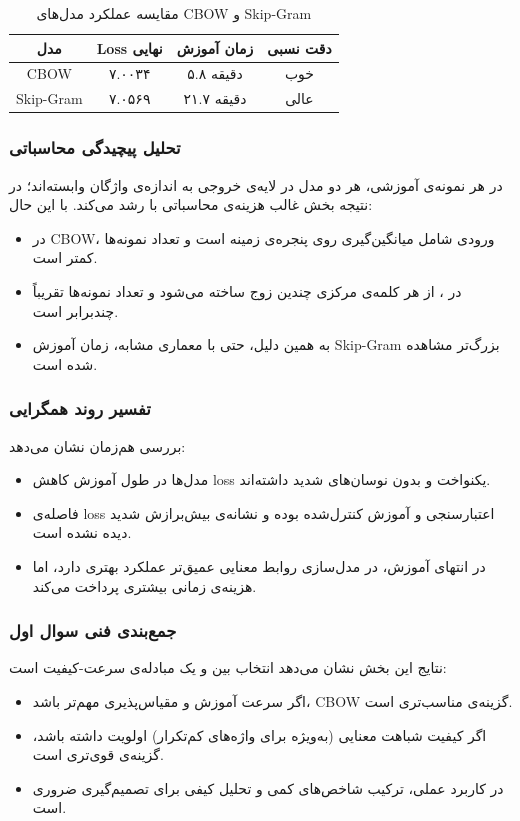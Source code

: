 \documentclass[12pt,a4paper]{article}
\begin{document}
\begin{table}[H]
\centering
\begin{tabular}{|c|c|c|c|}
\hline
\textbf{مدل} & \textbf{Loss نهایی} & \textbf{زمان آموزش} & \textbf{دقت نسبی} \\
\hline
CBOW & ۷.۰۰۳۴ & ۵.۸ دقیقه & خوب \\
Skip-Gram & ۷.۰۵۶۹ & ۲۱.۷ دقیقه & عالی \\
\hline
\end{tabular}
\caption{مقایسه عملکرد مدل‌های CBOW و Skip-Gram}
\end{table}

\subsubsection{تحلیل پیچیدگی محاسباتی}
در هر نمونه‌ی آموزشی، هر دو مدل در لایه‌ی خروجی به اندازه‌ی واژگان وابسته‌اند؛ در نتیجه بخش غالب هزینه‌ی محاسباتی با  رشد می‌کند. با این حال:
\begin{itemize}
\item در CBOW، ورودی شامل میانگین‌گیری روی پنجره‌ی زمینه است و تعداد نمونه‌ها کمتر است.
\item در ، از هر کلمه‌ی مرکزی چندین زوج  ساخته می‌شود و تعداد نمونه‌ها تقریباً چندبرابر  است.
\item به همین دلیل، حتی با معماری مشابه، زمان آموزش Skip-Gram بزرگ‌تر مشاهده شده است.
\end{itemize}

\subsubsection{تفسیر روند همگرایی}
بررسی هم‌زمان  نشان می‌دهد:
\begin{itemize}
\item مدل‌ها در طول آموزش کاهش loss یکنواخت و بدون نوسان‌های شدید داشته‌اند.
\item فاصله‌ی loss اعتبارسنجی و آموزش کنترل‌شده بوده و نشانه‌ی بیش‌برازش شدید دیده نشده است.
\item در انتهای آموزش،  در مدل‌سازی روابط معنایی عمیق‌تر عملکرد بهتری دارد، اما هزینه‌ی زمانی بیشتری پرداخت می‌کند.
\end{itemize}

\subsubsection{جمع‌بندی فنی سوال اول}
نتایج این بخش نشان می‌دهد انتخاب بین  و  یک مبادله‌ی سرعت-کیفیت است:
\begin{itemize}
\item اگر سرعت آموزش و مقیاس‌پذیری مهم‌تر باشد، CBOW گزینه‌ی مناسب‌تری است.
\item اگر کیفیت شباهت معنایی (به‌ویژه برای واژه‌های کم‌تکرار) اولویت داشته باشد،  گزینه‌ی قوی‌تری است.
\item در کاربرد عملی، ترکیب شاخص‌های کمی  و تحلیل کیفی  برای تصمیم‌گیری ضروری است.
\end{itemize}
\end{document}
